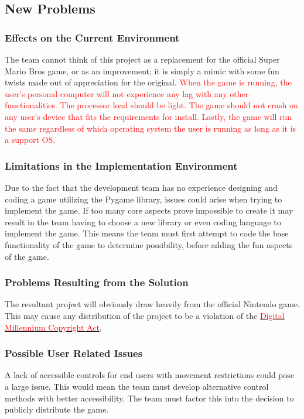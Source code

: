 \documentclass[12pt, titlepage]{article}
\begin{document}
\subsection{New Problems}
\subsubsection{Effects on the Current Environment}
The team cannot think of this project as a replacement for the official Super Mario Bros game, or as an improvement; it is simply a mimic with some fun twists made out of appreciation for the original. \textcolor{red}{When the game is running, the user's personal computer will not experience any lag with any other functionalities. The processor load should be light. The game should not crash on any user's device that fits the requirements for install. Lastly, the game will run the same regardless of which operating system the user is running as long as it is a support OS.}

\subsubsection{Limitations in the Implementation Environment}
Due to the fact that the development team has no experience designing and coding a game utilizing the Pygame library, issues could arise when trying to implement the game. If too many core aspects prove impossible to create it may result in the team having to choose a new library or even coding language to implement the game. This means the team must first attempt to code the base functionality of the game to determine possibility, before adding the fun aspects of the game.

\subsubsection{Problems Resulting from the Solution}
The resultant project will obviously draw heavily from the official Nintendo game. This may cause any distribution of the project to be a violation of the \href{https://www.copyright.gov/legislation/dmca.pdf}{\textcolor{red}{Digital Millennium Copyright Act}}.

\subsubsection{Possible User Related Issues}
A lack of accessible controls for end users with movement restrictions could pose a large issue. This would mean the team must develop alternative control methods with better accessibility. The team must factor this into the decision to publicly distribute the game.
\end{document}
